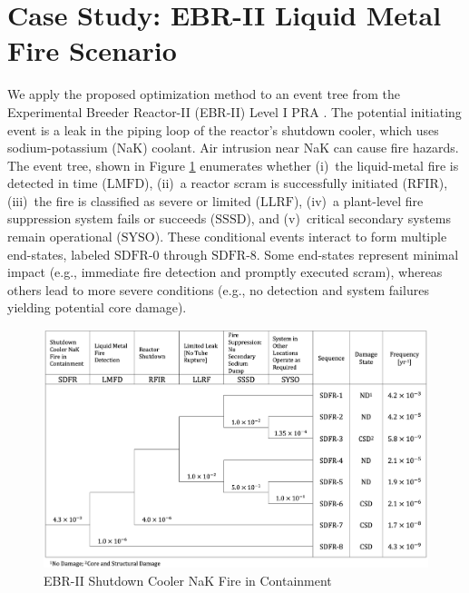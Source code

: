 \section{Case Study: EBR-II Liquid Metal Fire Scenario}
\label{sec:case_study_ebr2}
We apply the proposed optimization method to an event tree from the Experimental Breeder Reactor-II (EBR-II) Level I PRA \cite{chang_experimental_2018}. The potential initiating event is a leak in the piping loop of the reactor's shutdown cooler, which uses sodium-potassium (NaK) coolant. Air intrusion near NaK can cause fire hazards. The event tree, shown in Figure \ref{fig:ebr2_sdfr_et} enumerates whether (i)~the liquid-metal fire is detected in time (\(\text{LMFD}\)), (ii)~a reactor scram is successfully initiated (\(\text{RFIR}\)), (iii)~the fire is classified as severe or limited (\(\text{LLRF}\)), (iv)~a plant-level fire suppression system fails or succeeds (\(\text{SSSD}\)), and (v)~critical secondary systems remain operational (\(\text{SYSO}\)). These conditional events interact to form multiple end-states, labeled \(\text{SDFR-0}\) through \(\text{SDFR-8}\). Some end-states represent minimal impact (e.g., immediate fire detection and promptly executed scram), whereas others lead to more severe conditions (e.g., no detection and system failures yielding potential core damage).

\begin{figure}[h]
  \centering
\includegraphics[width=1.0\textwidth]{parts/4_learning/1_param/figs/event_tree_NaK_fire.png} 
    \caption{EBR-II Shutdown Cooler NaK Fire in Containment}
    \label{fig:ebr2_sdfr_et}
\end{figure}

